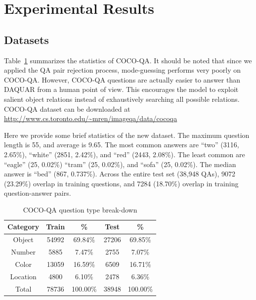 \section{Experimental Results}
\subsection{Datasets}
Table~\ref{tab:dataset_category_stats} summarizes the statistics of COCO-QA. It
should be noted that since we applied the QA pair rejection process,
mode-guessing performs very poorly on COCO-QA. However, COCO-QA questions are
actually easier to answer than DAQUAR from a human point of view. This
encourages the model to exploit salient object relations instead of
exhaustively searching all possible relations. COCO-QA dataset can be
downloaded at \url{http://www.cs.toronto.edu/~mren/imageqa/data/cocoqa}

Here we provide some brief statistics of the new dataset. The maximum question
length is 55, and average is 9.65.  The most common answers are ``two'' (3116,
2.65\%), ``white'' (2851, 2.42\%), and ``red'' (2443, 2.08\%). The least common
are ``eagle'' (25, 0.02\%) ``tram'' (25, 0.02\%), and ``sofa'' (25, 0.02\%).
The median answer is ``bed'' (867, 0.737\%).  Across the entire test set (38,948
QAs), 9072 (23.29\%) overlap in training questions, and 7284 (18.70\%) overlap
in training question-answer pairs.
\begin{table}
\caption{COCO-QA question type break-down}
\label{tab:dataset_category_stats}
\vskip 0.15in
\begin{center}
\begin{small}
\begin{sc}
\begin{tabular}{c c c c c}
\hline
Category & Train & \%       & Test  & \%       \\
\hline
Object   & 54992 & 69.84\%  & 27206 & 69.85\%  \\
Number   & 5885  & 7.47\%   & 2755  & 7.07\%   \\
Color    & 13059 & 16.59\%  & 6509  & 16.71\%  \\
Location & 4800  & 6.10\%   & 2478  & 6.36\%   \\
\hline
Total    & 78736 & 100.00\% & 38948 & 100.00\% \\
\hline
\end{tabular}
\end{sc}
\end{small}
\end{center}
\end{table}

